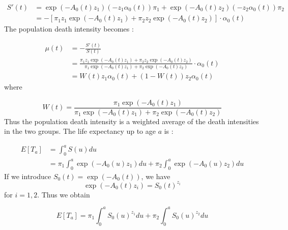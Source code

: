 \begin{equation}
\begin{split}
    S'(t) &= \exp(-A_{0}(t) z_{1})(-z_{1}\alpha_{0}(t))\pi_{1} +  \exp(-A_{0}(t) z_{2})(-z_{2}\alpha_{0}(t))\pi_{2} \\
        &= -[ \pi_{1}z_{1} \exp(-A_{0}(t)z_{1}) + \pi_{2}z_{2} \exp(-A_{0}(t)z_{2}) ]\cdot \alpha_{0}(t)
        \end{split}
\end{equation}
The population death intensity becomes :

 
\begin{equation}
 \begin{split}
      \mu(t)   &= - \frac{S'(t)}{S(t)} \\
               &= \frac{\pi_{1}z_{1} \exp(-A_{0}(t)z_{1})  + \pi_{2}z_{2} \exp(-A_{0}(t)z_{2})}{\pi_{1}\exp(-A_{0}(t)z_{1}) + \pi_{2}\exp(-A_{0}(t)z_{2}) } \cdot \alpha_{0}(t)\\
               &= W(t)z_{1}\alpha_{0}(t) + (1 - W(t))z_{2}\alpha_{0}(t)
    \label{deathIntensity population2}           
  \end{split}             
\end{equation}
where 


\begin{equation}
   W(t) = \frac{\pi_{1}\exp(-A_{0}(t)z_{1})}{\pi_{1}\exp(-A_{0}(t)z_{1}) + \pi_{2}\exp(-A_{0}(t)z_{2}) }
   \label{deathIntensity population3}
\end{equation}
Thus the population death intensity is a weighted average of the death intensities in the two groups.
The life expectancy up to age $a$ is :


\begin{equation}
    \begin{split}
     E[T_{a}] &= \int_{0}^{a} S(u)du \\
              &= \pi_{1}\int_{0}^{a} \exp(-A_{0}(u)z_{1})du +
                  \pi_{2}\int_{0}^{a} \exp(-A_{0}(u)z_{2})du
    \end{split} 
\end{equation}
If we introduce $ S_{0}(t) = \exp(-A_{0}(t)) $, we have 
\begin{equation*}
    \exp(-A_{0}(t)z_{i}) = S_{0}(t)^{z_{i}}
\end{equation*}
for $i = 1,2$.
Thus we obtain


\begin{equation}
    E[T_{a}]  =  \pi_{1}\int_{0}^{a} S_{0}(u)^{z_1}du + \pi_{2}\int_{0}^{a} S_{0}(u)^{z_2}du
    \label{life_expect_kapitel6}
\end{equation}



